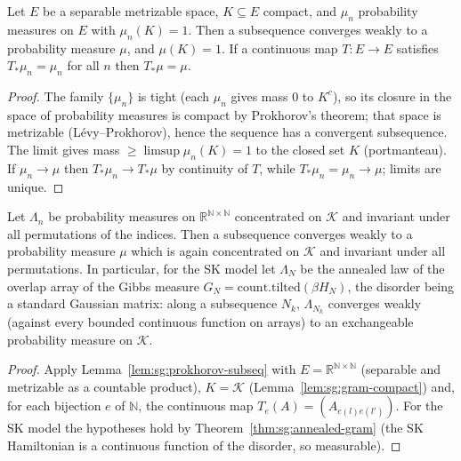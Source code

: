 \begin{lemma}\label{lem:sg:prokhorov-subseq}
  \leanok
Let $E$ be a separable metrizable space, $K\subseteq E$ compact, and $\mu_n$ probability measures on $E$ with $\mu_n(K)=1$. Then a subsequence converges weakly to a probability measure $\mu$, and $\mu(K)=1$.
If a continuous map $T:E\to E$ satisfies $T_*\mu_n=\mu_n$ for all $n$ then $T_*\mu=\mu$.
\end{lemma}

\begin{proof}
  \leanok
The family $\{\mu_n\}$ is tight (each $\mu_n$ gives mass $0$ to $K^c$), so its closure in the space of probability measures is compact by Prokhorov's theorem; that space is metrizable (L\'evy--Prokhorov), hence the sequence has a convergent subsequence.
The limit gives mass $\ge\limsup\mu_n(K)=1$ to the closed set $K$ (portmanteau). If $\mu_n\to\mu$ then $T_*\mu_n\to T_*\mu$ by continuity of $T$, while $T_*\mu_n=\mu_n\to\mu$; limits are unique.
\end{proof}

\begin{theorem}\label{thm:sg:asymptotic-overlap}
  \leanok
Let $\Lambda_n$ be probability measures on $\mathbb R^{\mathbb N\times\mathbb N}$ concentrated on $\mathcal K$ and invariant under all permutations of the indices. Then a subsequence converges weakly to a probability measure
$\mu$ which is again concentrated on $\mathcal K$ and invariant under all permutations. In particular, for the SK model let $\Lambda_N$ be the annealed law of the overlap array of the Gibbs measure $G_N=\mathrm{count.tilted}(\beta H_N)$,
the disorder being a standard Gaussian matrix: along a subsequence $N_k$, $\Lambda_{N_k}$ converges weakly (against every bounded continuous function on arrays) to an exchangeable probability measure on $\mathcal K$.
\end{theorem}

\begin{proof}
  \leanok
Apply Lemma~\ref{lem:sg:prokhorov-subseq} with $E=\mathbb R^{\mathbb N\times\mathbb N}$ (separable and metrizable as a countable product), $K=\mathcal K$ (Lemma~\ref{lem:sg:gram-compact}) and, for each bijection $e$ of $\mathbb N$,
the continuous map $T_e(A)=(A_{e(l)e(l')})$. For the SK model the hypotheses hold by Theorem~\ref{thm:sg:annealed-gram} (the SK Hamiltonian is a continuous function of the disorder, so measurable).
\end{proof}

